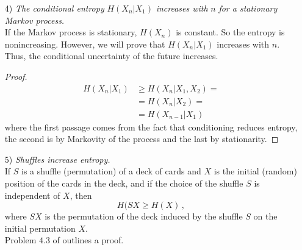\begin{itemize}
    most closely with statistical thermodynamics, where all the microstates are equally likely. We now characterize processes having a
    uniform stationary distribution.
    \begin{definition}
        \hfill \\
        A probability transition matrix $P$ is called \textbf{doubly stochastic} if 
        \begin{equation}
            \sum_i P_{ij} = 1 \quad \forall j \qquad \quad \sum_j P_{ij} = 1 \quad \forall i
        \end{equation}
    \end{definition}
    \begin{theorem}
        \hfill \\
        The uniform distribution is a stationary distribution of P if and only if the probability transition matrix is doubly stochastic.
    \end{theorem}
    \begin{proof}
        See \cite{Cover_and_Thomas}, problem $4.1$.
    \end{proof}
    \item[4)] \textit{The conditional entropy} $H(X_n|X_1)$ \textit{increases with} $n$ \textit{for a stationary Markov process.} \\
    If the Markov process is stationary, $H(X_n)$ is constant. So the entropy is nonincreasing. However, we will prove that $H(X_n|X_1)$ increases with $n$. Thus, the conditional uncertainty
    of the future increases.
    \begin{proof}
        \begin{align*}
            H(X_n|X_1) &\geq H(X_n|X_1,X_2) = \\ &= H(X_n|X_2) =\\&= H(X_{n-1}|X_1)  
        \end{align*}
        where the first passage comes from the fact that conditioning reduces entropy, the second is by Markovity of the process and the last by stationarity.
    \end{proof}
    \item[5)] \textit{Shuffles increase entropy.} \\
    If $S$ is a shuffle (permutation) of a deck of cards and $X$ is the initial (random) position of the cards in the
    deck, and if the choice of the shuffle $S$ is independent of $X$, then 
    \begin{equation}
        H(SX \geq H(X) \, ,
    \end{equation}
    where $SX$ is the permutation of the deck induced by the shuffle $S$ on the initial permutation $X$. 
    \\Problem $4.3$ of \cite{Cover_and_Thomas} outlines a proof. 
\end{itemize}



